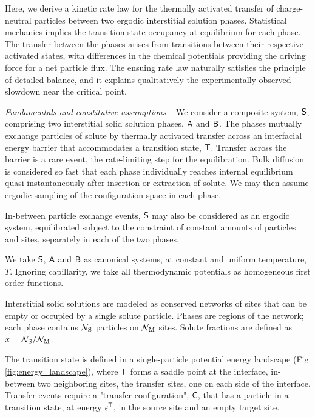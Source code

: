 \documentclass[english,aps,prb,showkeys,reprint]{revtex4-2}
\begin{document}
Here, we derive a kinetic rate law for the thermally activated transfer of charge-neutral particles between two ergodic interstitial solution phases. Statistical mechanics implies the transition state occupancy at equilibrium for each phase. The transfer between the phases arises from transitions between their respective activated states, with differences in the chemical potentials providing the driving force for a net particle flux. The ensuing rate law naturally satisfies the principle of detailed balance, and it explains qualitatively the experimentally observed slowdown near the critical point.

\textit{Fundamentals and constitutive assumptions}
--
We consider a composite system, $\sf S$, comprising two interstitial solid solution phases, $\sf A$ and $\sf B$. The phases mutually exchange particles of solute by thermally activated transfer across an interfacial energy barrier that accommodates a transition state, $\sf T$. Transfer across the barrier is a rare event, the rate-limiting step for the equilibration. Bulk diffusion is considered so fast that each phase individually reaches internal equilibrium quasi instantaneously after insertion or extraction of solute. We may then assume ergodic sampling of the configuration space in each phase.

In-between particle exchange events, $\sf S$ may also be considered as an ergodic system, equilibrated subject to the constraint of constant amounts of particles and sites, separately in each of the two phases.

We take $\sf S$, $\sf A$ and $\sf B$ as canonical systems, at constant and uniform temperature, $T$. Ignoring capillarity, we take all thermodynamic potentials as homogeneous first order functions.

Interstitial solid solutions are modeled as conserved networks of sites that can be empty or occupied by a single solute particle. Phases are regions of the network; each phase contains $\mathcal{N}_{\rm S}$ particles on $\mathcal{N}_{\rm M}$ sites. Solute fractions are defined as $x = \mathcal{N}_{\rm S} / \mathcal{N}_{\rm M}$.

The transition state is defined in a single-particle potential energy landscape (Fig \ref{fig:energy_landscape}), where $\sf T$ forms a saddle point at the interface, in-between two neighboring sites, the transfer sites, one on each side of the interface. Transfer events require a "transfer configuration", $\sf C$, that has a particle in a transition state, at energy $\epsilon^{\sf T}$, in the source site and an empty target site.
\end{document}
